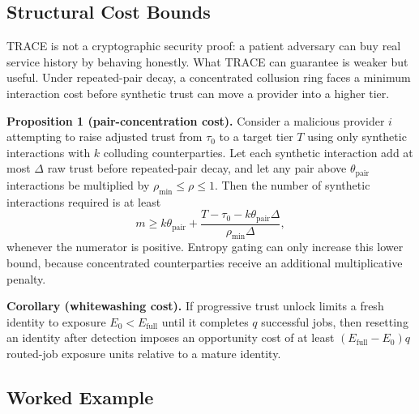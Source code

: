 \documentclass[sigconf,nonacm,10pt]{acmart}
\begin{document}
\subsection{Structural Cost Bounds}
\label{sec:bounds}

TRACE is not a cryptographic security proof: a patient adversary can buy
real service history by behaving honestly. What TRACE can guarantee is
weaker but useful. Under repeated-pair decay, a concentrated collusion
ring faces a minimum interaction cost before synthetic trust can move a
provider into a higher tier.

\noindent\textbf{Proposition 1 (pair-concentration cost).}
Consider a malicious provider $i$ attempting to raise adjusted trust
from $\tau_0$ to a target tier $T$ using only synthetic interactions
with $k$ colluding counterparties. Let each synthetic interaction add at
most $\Delta$ raw trust before repeated-pair decay, and let any pair
above $\theta_{\text{pair}}$ interactions be multiplied by
$\rho_{\min} \leq \rho \leq 1$. Then the number of synthetic
interactions required is at least
\begin{equation}
  m \geq k\theta_{\text{pair}} +
  \frac{T-\tau_0-k\theta_{\text{pair}}\Delta}
       {\rho_{\min}\Delta},
  \label{eq:synthetic-cost}
\end{equation}
whenever the numerator is positive. Entropy gating can only increase
this lower bound, because concentrated counterparties receive an
additional multiplicative penalty.

\noindent\textbf{Corollary (whitewashing cost).}
If progressive trust unlock limits a fresh identity to exposure
$E_0 < E_{\text{full}}$ until it completes $q$ successful jobs, then
resetting an identity after detection imposes an opportunity cost of at
least $(E_{\text{full}}-E_0)q$ routed-job exposure units relative to a
mature identity.

\subsection{Worked Example}
\end{document}
